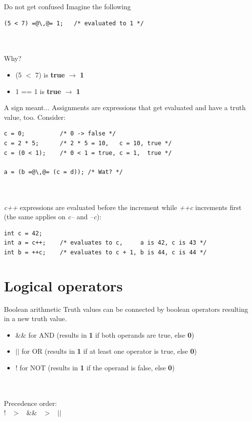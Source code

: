 \begin{frame}[fragile]{Do not get confused}
	Imagine the following
	\begin{lstlisting}[numbers=none]
(5 < 7) =@\,@= 1;   /* evaluated to 1 */
\end{lstlisting}
\ \\\ \\Why?
\begin{itemize}
	\item<2-> (5 $<$ 7) is \textbf{true} $\rightarrow$ \textbf{1}
	\item<3-> 1 == 1 is \textbf{true} $\rightarrow$ \textbf{1}
\end{itemize}

\end{frame}
\begin{frame}[fragile]{A sign meant...}
	Assignments are expressions that get evaluated and have a truth value, too.
	Consider:
		\begin{lstlisting}[numbers=none]
c = 0;          /* 0 -> false */
c = 2 * 5;      /* 2 * 5 = 10,   c = 10, true */
c = (0 < 1);    /* 0 < 1 = true, c = 1,  true */

a = (b =@\,@= (c = d)); /* Wat? */
\end{lstlisting}\ \\
	\pause
	\ \\\textit{c++} expressions are evaluated before the increment while \textit{++c} increments first (the same applies on \textit{c--} and \textit{--c}):
	\begin{lstlisting}[numbers=none]
int c = 42;
int a = c++;    /* evaluates to c,     a is 42, c is 43 */
int b = ++c;    /* evaluates to c + 1, b is 44, c is 44 */
\end{lstlisting}
\end{frame}
\section{Logical operators}

\begin{frame}{Boolean arithmetic}
	Truth values can be connected by boolean operators resulting in a new truth value.
	\begin{itemize}
		\item \&\& for AND (results in \textbf{1} if both operands are true, else \textbf{0})
		\item $||$ for OR (results in \textbf{1} if at least one operator is true, else \textbf{0})
		\item ! for NOT (results in \textbf{1} if the operand is false, else \textbf{0})
	\end{itemize}
	\ \\\ \\Precedence order:\\
	\centering
	! \ $>$ \ \&\& \ $>$ \ $||$ 
\end{frame}

